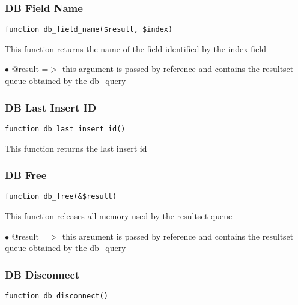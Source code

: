 \documentclass[a4paper]{article}
\begin{document}
\hypertarget{toc92}{}
\subsubsection{DB Field Name}

\begin{lstlisting}
function db_field_name($result, $index)
\end{lstlisting}

This function returns the name of the field identified by the index field

\begin{compactitem}
\item[\color{myblue}$\bullet$] @result =$>$ this argument is passed by reference and contains the resultset queue
           obtained by the db\_query
\end{compactitem}

\hypertarget{toc93}{}
\subsubsection{DB Last Insert ID}

\begin{lstlisting}
function db_last_insert_id()
\end{lstlisting}

This function returns the last insert id

\hypertarget{toc94}{}
\subsubsection{DB Free}

\begin{lstlisting}
function db_free(&$result)
\end{lstlisting}

This function releases all memory used by the resultset queue

\begin{compactitem}
\item[\color{myblue}$\bullet$] @result =$>$ this argument is passed by reference and contains the resultset queue
           obtained by the db\_query
\end{compactitem}

\hypertarget{toc95}{}
\subsubsection{DB Disconnect}

\begin{lstlisting}
function db_disconnect()
\end{lstlisting}
\end{document}
